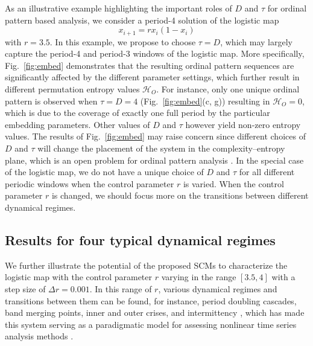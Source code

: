 \documentclass[aip,cha,reprint,nofootinbib]{revtex4-1}
\begin{document}
As an illustrative example highlighting the important roles of $D$ and $\tau$ for ordinal pattern based analysis, we consider a period-4 solution of the logistic map 
\begin{equation}
x_{i+1}=rx_i(1-x_i) 
\end{equation}
\noindent
with $r= 3.5$. {\color{red}In this example, we propose to choose $\tau = D$, which may largely capture the period-4 and period-3 windows of the logistic map. More specifically,} Fig.~\ref{fig:embed} demonstrates that the resulting ordinal pattern sequences are significantly affected by the different parameter settings, which further result in different permutation entropy values $\mathcal{H}_O$. For instance, only one unique ordinal pattern is observed when $\tau = D = 4$ (Fig.~\ref{fig:embed}(c, g)) resulting in $\mathcal{H}_O = 0$, which is due to the coverage of exactly one full period by the particular embedding parameters. Other values of $D$ and $\tau$ however yield non-zero entropy values. The results of Fig.~\ref{fig:embed} may raise concern since different choices of $D$ and $\tau$ will change the placement of the system in the complexity--entropy plane{\color{red}, which is an open problem for ordinal pattern analysis \cite{AmigoPTRSA2014,Riedl2013}.} In the special case of the logistic map, we do not have a unique choice of $D$ and $\tau$ for {\color{red}all different} periodic windows when the control parameter $r$ is varied. When the control parameter $r$ is changed, we should focus more on the transitions between different dynamical regimes. 

\subsection{Results for four typical dynamical regimes} \label{sec:four}
We further illustrate the potential of the proposed SCMs to characterize the logistic map with the control parameter $r$ varying in the range $[3.5, 4]$ with a step size of $\Delta r = 0.001$. In this range of $r$, various dynamical regimes and transitions between them can be found, for instance, period doubling cascades, band merging points, inner and outer crises, and intermittency \cite{Kantz97}, which has made this system serving as a paradigmatic model for assessing nonlinear time series analysis methods \cite{MarwanPLA2009}. 
\end{document}
